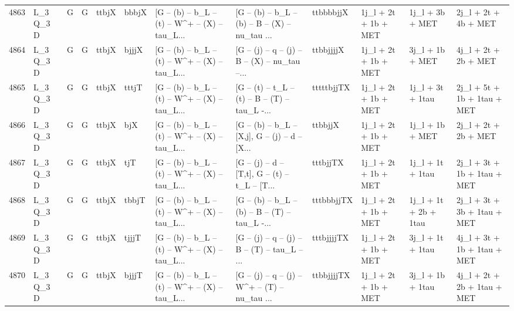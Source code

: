 \begin{tabular}{llllllllllll}
4863 &    L\_3 Q\_3 D &     G &     G &       ttbjX &       bbbjX &  [G -- (b) -- b\_L -- (t) -- W\textasciicircum + -- (X) -- tau\_L... &  [G -- (b) -- b\_L -- (b) -- B -- (X) -- nu\_tau ... &   ttbbbbjjX &     1j\_l + 2t + 1b + MET &          1j\_l + 3b + MET &               2j\_l + 2t + 4b + MET \\
4864 &    L\_3 Q\_3 D &     G &     G &       ttbjX &       bjjjX &  [G -- (b) -- b\_L -- (t) -- W\textasciicircum + -- (X) -- tau\_L... &  [G -- (j) -- q -- (j) -- B -- (X) -- nu\_tau --... &   ttbbjjjjX &     1j\_l + 2t + 1b + MET &          3j\_l + 1b + MET &               4j\_l + 2t + 2b + MET \\
4865 &    L\_3 Q\_3 D &     G &     G &       ttbjX &       tttjT &  [G -- (b) -- b\_L -- (t) -- W\textasciicircum + -- (X) -- tau\_L... &  [G -- (t) -- t\_L -- (t) -- B -- (T) -- tau\_L -... &  tttttbjjTX &     1j\_l + 2t + 1b + MET &         1j\_l + 3t + 1tau &        2j\_l + 5t + 1b + 1tau + MET \\
4866 &    L\_3 Q\_3 D &     G &     G &       ttbjX &         bjX &  [G -- (b) -- b\_L -- (t) -- W\textasciicircum + -- (X) -- tau\_L... &  [G -- (b) -- b\_L -- [X,j], G -- (j) -- d -- [X... &     ttbbjjX &     1j\_l + 2t + 1b + MET &          1j\_l + 1b + MET &               2j\_l + 2t + 2b + MET \\
4867 &    L\_3 Q\_3 D &     G &     G &       ttbjX &         tjT &  [G -- (b) -- b\_L -- (t) -- W\textasciicircum + -- (X) -- tau\_L... &  [G -- (j) -- d -- [T,t], G -- (t) -- t\_L -- [T... &    tttbjjTX &     1j\_l + 2t + 1b + MET &         1j\_l + 1t + 1tau &        2j\_l + 3t + 1b + 1tau + MET \\
4868 &    L\_3 Q\_3 D &     G &     G &       ttbjX &       tbbjT &  [G -- (b) -- b\_L -- (t) -- W\textasciicircum + -- (X) -- tau\_L... &  [G -- (b) -- b\_L -- (b) -- B -- (T) -- tau\_L -... &  tttbbbjjTX &     1j\_l + 2t + 1b + MET &    1j\_l + 1t + 2b + 1tau &        2j\_l + 3t + 3b + 1tau + MET \\
4869 &    L\_3 Q\_3 D &     G &     G &       ttbjX &       tjjjT &  [G -- (b) -- b\_L -- (t) -- W\textasciicircum + -- (X) -- tau\_L... &  [G -- (j) -- q -- (j) -- B -- (T) -- tau\_L -- ... &  tttbjjjjTX &     1j\_l + 2t + 1b + MET &         3j\_l + 1t + 1tau &        4j\_l + 3t + 1b + 1tau + MET \\
4870 &    L\_3 Q\_3 D &     G &     G &       ttbjX &       bjjjT &  [G -- (b) -- b\_L -- (t) -- W\textasciicircum + -- (X) -- tau\_L... &  [G -- (j) -- q -- (j) -- W\textasciicircum + -- (T) -- nu\_tau ... &  ttbbjjjjTX &     1j\_l + 2t + 1b + MET &         3j\_l + 1b + 1tau &        4j\_l + 2t + 2b + 1tau + MET \\

\end{tabular}
